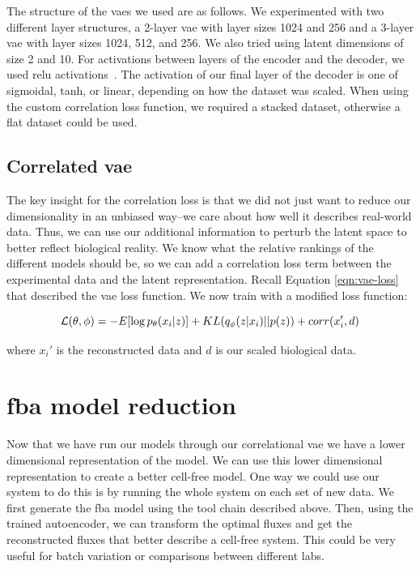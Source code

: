 The structure of the \glspl{vae} we used are as follows.
We experimented with two different layer structures, a 2-layer \gls{vae} with layer sizes 1024 and 256 and a 3-layer \gls{vae} with layer sizes 1024, 512, and 256.
We also tried using latent dimensions of size 2 and 10.
For activations between layers of the encoder and the decoder, we used \gls{relu} activations~\cite{nair2010rectified}.
The activation of our final layer of the decoder is one of sigmoidal, tanh, or linear, depending on how the dataset was scaled.
When using the custom correlation loss function, we required a stacked dataset, otherwise a flat dataset could be used.

\subsection{Correlated \gls{vae}}
The key insight for the correlation loss is that we did not just want to reduce our dimensionality in an unbiased way--we care about how well it describes real-world data.
Thus, we can use our additional information to perturb the latent space to better reflect biological reality.
We know what the relative rankings of the different models should be, so we can add a correlation loss term between the experimental data and the latent representation.
Recall Equation \ref{eqn:vae-loss} that described the \gls{vae} loss function.
We now train with a modified loss function:


\begin{equation}\label{eqn:corr-loss}
\mathcal{L}(\theta, \phi) = - E[\log p_{\theta}(x_i | z)] + KL(q_{\phi}(z | x_i) || p(z)) + corr(x_i', d)\\
\end{equation}

where $x_i'$ is the reconstructed data and $d$ is our scaled biological data.

\section{\gls{fba} model reduction}
Now that we have run our models through our correlational \gls{vae} we have a lower dimensional representation of the model.
We can use this lower dimensional representation to create a better cell-free model.
One way we could use our system to do this is by running the whole system on each set of new data.
We first generate the \gls{fba} model using the tool chain described above.
Then, using the trained autoencoder, we can transform the optimal fluxes and get the reconstructed fluxes that better describe a cell-free system.
This could be very useful for batch variation or comparisons between different labs.

